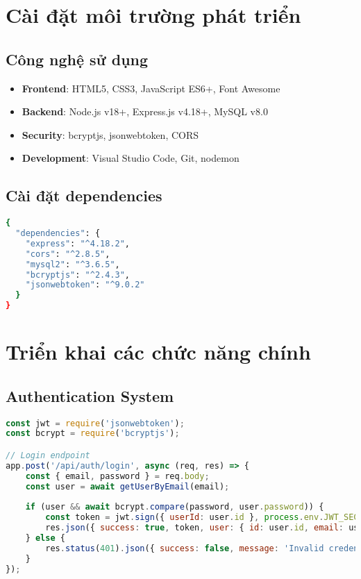\setcounter{section}{0} %
\renewcommand{\thesection}{\thechapter.\arabic{section}}

\section{Cài đặt môi trường phát triển}

\subsection{Công nghệ sử dụng}
\begin{itemize}
    \item \textbf{Frontend}: HTML5, CSS3, JavaScript ES6+, Font Awesome
    \item \textbf{Backend}: Node.js v18+, Express.js v4.18+, MySQL v8.0
    \item \textbf{Security}: bcryptjs, jsonwebtoken, CORS
    \item \textbf{Development}: Visual Studio Code, Git, nodemon
\end{itemize}

\subsection{Cài đặt dependencies}
\begin{lstlisting}[language=bash, title={Package.json dependencies}]
{
  "dependencies": {
    "express": "^4.18.2",
    "cors": "^2.8.5",
    "mysql2": "^3.6.5",
    "bcryptjs": "^2.4.3",
    "jsonwebtoken": "^9.0.2"
  }
}
\end{lstlisting}

\section{Triển khai các chức năng chính}

\subsection{Authentication System}
\begin{lstlisting}[language=JavaScript, title={JWT Authentication}]
const jwt = require('jsonwebtoken');
const bcrypt = require('bcryptjs');

// Login endpoint
app.post('/api/auth/login', async (req, res) => {
    const { email, password } = req.body;
    const user = await getUserByEmail(email);
    
    if (user && await bcrypt.compare(password, user.password)) {
        const token = jwt.sign({ userId: user.id }, process.env.JWT_SECRET);
        res.json({ success: true, token, user: { id: user.id, email: user.email } });
    } else {
        res.status(401).json({ success: false, message: 'Invalid credentials' });
    }
});
\end{lstlisting}

